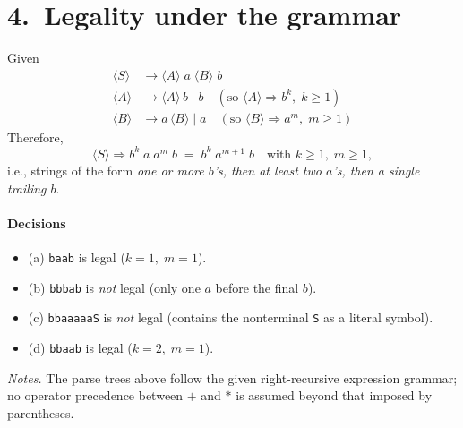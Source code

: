 \documentclass[11pt]{article}
\begin{document}
\section*{4.\ Legality under the grammar}
Given
\begin{align*}
\langle S\rangle &\to \langle A\rangle\; a\; \langle B\rangle\; b\\
\langle A\rangle &\to \langle A\rangle\, b \mid b \quad (\text{so } \langle A\rangle \Rightarrow b^k,\; k\ge 1)\\
\langle B\rangle &\to a\,\langle B\rangle \mid a \quad (\text{so } \langle B\rangle \Rightarrow a^m,\; m\ge 1)
\end{align*}
Therefore,
\[
\langle S\rangle \Rightarrow b^{k}\; a\; a^{m}\; b \;=\; b^{k}\; a^{m+1}\; b
\quad\text{with } k\ge 1,\; m\ge 1,
\]
i.e., strings of the form \emph{one or more $b$'s, then at least two $a$'s, then a single trailing $b$}.

\paragraph{Decisions}
\begin{itemize}
  \item (a) \texttt{baab} \;is legal ($k=1,\; m=1$).
  \item (b) \texttt{bbbab} \;is \emph{not} legal (only one $a$ before the final $b$).
  \item (c) \texttt{bbaaaaaS} \;is \emph{not} legal (contains the nonterminal \texttt{S} as a literal symbol).
  \item (d) \texttt{bbaab} \;is legal ($k=2,\; m=1$).
\end{itemize}

\vfill
\noindent\textit{Notes.} The parse trees above follow the given right-recursive expression grammar; no operator precedence between $+$ and $*$ is assumed beyond that imposed by parentheses.
\end{document}
